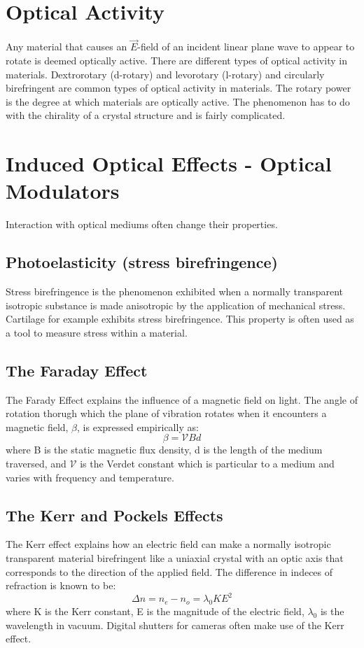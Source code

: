 \documentclass[12pt]{report}
\begin{document}
\section{Optical Activity}
Any material that causes an $\vec{E}$-field of an incident linear plane wave to appear to rotate is deemed optically active. There are different types of optical activity in materials. Dextrorotary (d-rotary) and levorotary (l-rotary) and circularly birefringent are common types of optical activity in materials. The rotary power is the degree at which materials are optically active. The phenomenon has to do with the chirality of a crystal structure and is fairly complicated. 

\section{Induced Optical Effects - Optical Modulators}
Interaction with optical mediums often change their properties. 
\subsection{Photoelasticity (stress birefringence)}
Stress birefringence is the phenomenon exhibited when a normally transparent isotropic substance is made anisotropic by the application of mechanical stress. Cartilage for example exhibits stress birefringence. This property is often used as a tool to measure stress within a material. 

\subsection{The Faraday Effect}
The Farady Effect explains the influence of a magnetic field on light. The angle of rotation thorugh which the plane of vibration rotates when it encounters a magnetic field, $\beta$, is expressed empirically as:
\begin{equation}
\beta = \mathcal{V}Bd
\end{equation}
where B is the static magnetic flux density, d is the length of the medium traversed, and $\mathcal{V}$ is the Verdet constant which is particular to a medium and varies with frequency and temperature. 
\subsection{The Kerr and Pockels Effects}
The Kerr effect explains how an electric field can make a normally isotropic transparent material birefringent like a uniaxial crystal with an optic axis that corresponds to the direction of the applied field. The difference in indeces of refraction is known to be:
\[\Delta n = n_e-n_o = \lambda_0KE^2\] where K is the Kerr constant, E is the magnitude of the electric field,  $\lambda_0$ is the wavelength in vacuum. Digital shutters for cameras often make use of the Kerr effect. 
\end{document}
